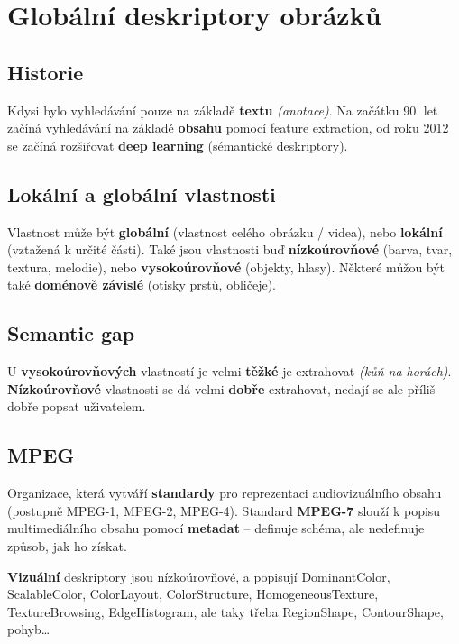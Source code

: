 \section{Globální deskriptory obrázků}

\subsection{Historie}

Kdysi bylo vyhledávání pouze na základě \textbf{textu} \textit{(anotace)}. Na začátku 90. let začíná vyhledávání na základě \textbf{obsahu} pomocí feature extraction, od roku 2012 se začíná rozšiřovat \textbf{deep learning} (sémantické deskriptory).

\subsection{Lokální a globální vlastnosti}

Vlastnost může být \textbf{globální} (vlastnost celého obrázku / videa), nebo \textbf{lokální} (vztažená k určité části). Také jsou vlastnosti buď \textbf{nízkoúrovňové} (barva, tvar, textura, melodie), nebo \textbf{vysokoúrovňové} (objekty, hlasy). Některé můžou být také \textbf{doménově závislé} (otisky prstů, obličeje).

\subsection{Semantic gap}

U \textbf{vysokoúrovňových} vlastností je velmi \textbf{těžké} je extrahovat \textit{(kůň na horách)}. \textbf{Nízkoúrovňové} vlastnosti se dá velmi \textbf{dobře} extrahovat, nedají se ale příliš dobře popsat uživatelem.

\subsection{MPEG}

Organizace, která vytváří \textbf{standardy} pro reprezentaci audiovizuálního obsahu (postupně MPEG-1, MPEG-2, MPEG-4). Standard \textbf{MPEG-7} slouží k popisu multimediálního obsahu pomocí \textbf{metadat} -- definuje schéma, ale nedefinuje způsob, jak ho získat.

\textbf{Vizuální} deskriptory jsou nízkoúrovňové, a popisují DominantColor, ScalableColor, ColorLayout, ColorStructure, HomogeneousTexture, TextureBrowsing, EdgeHistogram, ale taky třeba RegionShape, ContourShape, pohyb\ldots


